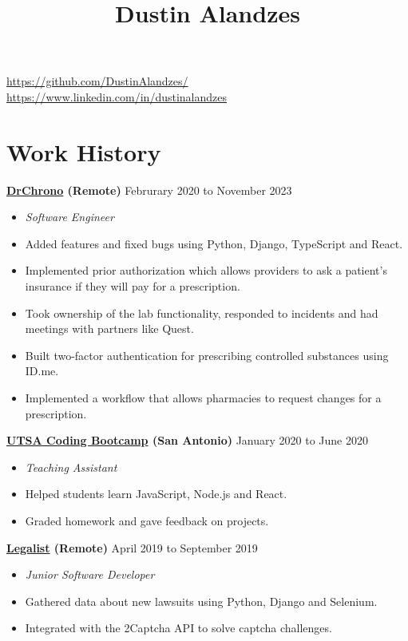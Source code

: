 \documentclass[10pt]{article}
\title{Dustin Alandzes}
\author{}
\date{}
\begin{document}
   \pagestyle{empty}
   \maketitle
   \thispagestyle{empty}

   \begin{center}
    \href{https://github.com/DustinAlandzes/}{https://github.com/DustinAlandzes/}
    \href{https://www.linkedin.com/in/dustinalandzes}{https://www.linkedin.com/in/dustinalandzes}
   \end{center}

   \section*{Work History}
   \textbf{\href{https://www.drchrono.com/}{DrChrono} (Remote)} \hfill {Februrary 2020 to November 2023}
   \begin{itemize}
     \item[] \textit{Software Engineer}
     \item[] Added features and fixed bugs using Python, Django, TypeScript and React.
     \item[] Implemented prior authorization which allows providers to ask a patient's insurance if they will pay for a prescription.
     \item[] Took ownership of the lab functionality, responded to incidents and had meetings with partners like Quest.
     \item[] Built two-factor authentication for prescribing controlled substances using ID.me.
     \item[] Implemented a workflow that allows pharmacies to request changes for a prescription.
    \end{itemize}

   \textbf{\href{https://bootcamp.utsa.edu/coding/}{UTSA Coding Bootcamp} (San Antonio)} \hfill {January 2020 to June 2020}
    \begin{itemize}
     \item[] \textit{Teaching Assistant}
     \item[] Helped students learn JavaScript, Node.js and React.
     \item[] Graded homework and gave feedback on projects.
    \end{itemize}

     \textbf{\href{https://www.legalist.com/}{Legalist} (Remote)} \hfill {April 2019 to September 2019}
    \begin{itemize}
     \item[] \textit{Junior Software Developer}
     \item[] Gathered data about new lawsuits using Python, Django and Selenium.
     \item[] Integrated with the 2Captcha API to solve captcha challenges.
    \end{itemize}
\end{document}
